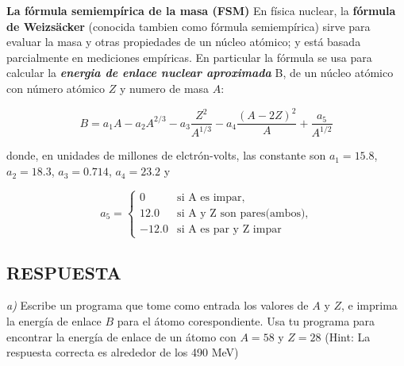 \documentclass[11pt]{article}
\begin{document}
\textbf{La fórmula semiempírica de la masa (FSM)} En física nuclear, la
\textbf{fórmula de Weizsäcker} (conocida tambien como fórmula
semiempírica) sirve para evaluar la masa y otras propiedades de un
núcleo atómico; y está basada parcialmente en mediciones empíricas. En
particular la fórmula se usa para calcular la \textbf{\emph{energia de
enlace nuclear aproximada}} B, de un núcleo atómico con número atómico
\(Z\) y numero de masa \(A\):

\[
B = a_1 A - a_2 A^{2/3} - a_3 \frac{Z^2}{A^{1/3}}
- a_4 \frac{(A-2Z)^2}{A} + \frac{a_5}{A^{1/2}}
\]

donde, en unidades de millones de elctrón-volts, las constante son
\(a_1 = 15.8\), \(a_2 = 18.3\), \(a_3 = 0.714\), \(a_4 = 23.2\) y

\[
a_5 =
\begin{cases}
0 & \text{si A es impar},\\
12.0 & \text{si A y Z son pares(ambos),}\\
-12.0 & \text{si A es par y Z impar}
\end{cases}
\]

    \hypertarget{respuesta}{%
\subsection{RESPUESTA}\label{respuesta}}

    \emph{a)} Escribe un programa que tome como entrada los valores de \(A\)
y \(Z\), e imprima la energía de enlace \(B\) para el átomo
corespondiente. Usa tu programa para encontrar la energía de enlace de
un átomo con \(A = 58\) y \(Z = 28\) (Hint: La respuesta correcta es
alrededor de los 490 MeV)
\end{document}
